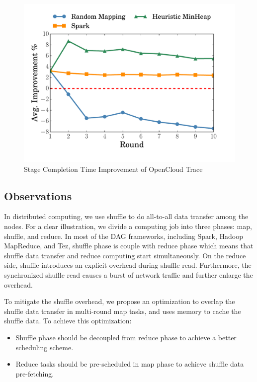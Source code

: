 \begin{figure}
	\centering
	\includegraphics[width=.6\linewidth]{fig/sim} %
	\caption{Stage Completion Time Improvement of OpenCloud Trace}
	\label{fig:sim}
\end{figure}

{\color{blue}
\subsection{Observations}\label{observation}

In distributed computing, we use shuffle to do all-to-all data transfer among the nodes.
For a clear illustration, we divide a computing job into three phases: map, shuffle, and reduce.
In most of the DAG frameworks, including Spark, Hadoop MapReduce, and Tez, shuffle phase is couple with reduce phase which means that shuffle data transfer and reduce computing start simultaneously.
On the reduce side, shuffle introduces an explicit overhead during shuffle read.
Furthermore, the synchronized shuffle read causes a burst of network traffic and further enlarge the overhead.

To mitigate the shuffle overhead, we propose an optimization to overlap the shuffle data transfer in multi-round map tasks, and uses memory to cache the shuffle data. To achieve this optimization:
\begin{itemize}
	\item Shuffle phase should be decoupled from reduce phase to achieve a better scheduling scheme.
	\item Reduce tasks should be pre-scheduled in map phase to achieve shuffle data pre-fetching.
\end{itemize}
}


